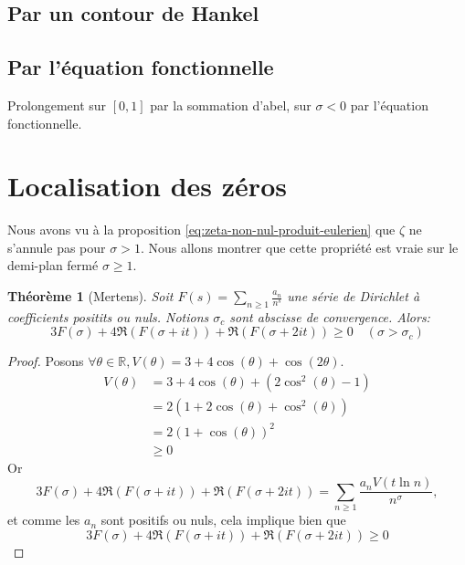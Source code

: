 \documentclass[french]{report}
\newtheorem{theorem}{Théorème}[section]
\begin{document}
\subsection{Par un contour de Hankel}


\subsection{Par l'équation fonctionnelle}

Prolongement sur $[0,1]$ par la sommation d'abel, sur $\sigma<0$ par l'équation fonctionnelle.

\section{Localisation des zéros}

Nous avons vu à la proposition \ref{eq:zeta-non-nul-produit-eulerien} que $\zeta$ ne s'annule pas pour $\sigma>1$. Nous allons montrer que cette propriété est vraie sur le demi-plan fermé $\sigma\geq1$.

\begin{theorem}[Mertens]
  Soit $F(s) =\sum_{n\geq1}\frac{a_n}{n^s}$ une série de Dirichlet à coefficients positits ou nuls. Notions $\sigma_c$ sont abscisse de convergence. Alors:
  \[ 3F(\sigma)+4\Re(F(\sigma+it))+\Re(F(\sigma+2it))\geq0 \quad(\sigma>\sigma_c) \]
\end{theorem}

\begin{proof}
  Posons $\forall\theta\in\mathbb{R}, V(\theta) = 3+4\cos(\theta)+\cos(2\theta)$.
  \begin{align*}
    V(\theta) &= 3+4\cos(\theta)+(2\cos^2(\theta)-1) \\
              &= 2(1+2\cos(\theta)+\cos^2(\theta)) \\
              &= 2(1+\cos(\theta))^2 \\
              &\geq0
  \end{align*}
  Or
  \[ 3F(\sigma)+4\Re(F(\sigma+it))+\Re(F(\sigma+2it)) = \sum_{n\geq1}\frac{a_n V(t\ln n)}{n^\sigma}, \]
  et comme les $a_n$ sont positifs ou nuls, cela implique bien que
  \[ 3F(\sigma)+4\Re(F(\sigma+it))+\Re(F(\sigma+2it))\geq0 \]
\end{proof}
\end{document}
